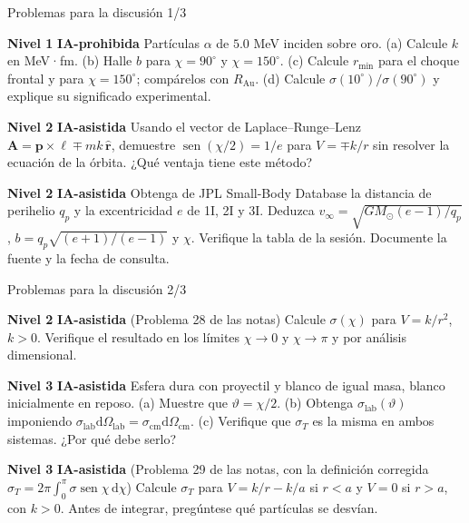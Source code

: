 \documentclass[aspectratio=169]{beamer}
\providecommand{\sen}{}
\renewcommand{\sen}{\operatorname{sen}}
\newcommand{\rmin}{r_{\min}}
\newcommand{\dd}{\mathrm{d}}
\newcommand{\IAprohibida}{\colorbox{red!20}{\scriptsize\textbf{IA-prohibida}}}
\newcommand{\IAasistida}{\colorbox{yellow!30}{\scriptsize\textbf{IA-asistida}}}
\newcommand{\nivel}[1]{\colorbox{blue!12}{\scriptsize\textbf{Nivel #1}}}
\begin{document}
\begin{frame}{Problemas para la discusión 1/3}
\small
\begin{description}[P0]
  \item[P1] \nivel{1} \IAprohibida{}
        Partículas $\alpha$ de $5.0$ MeV inciden sobre oro.
        (a) Calcule $k$ en MeV·fm. (b) Halle $b$ para $\chi=90^\circ$ y $\chi=150^\circ$.
        (c) Calcule $\rmin$ para el choque frontal y para $\chi=150^\circ$; compárelos con
        $R_{\text{Au}}$. (d) Calcule $\sigma(10^\circ)/\sigma(90^\circ)$ y explique su significado
        experimental.
  \item[P2] \nivel{2} \IAasistida{}
        Usando el vector de Laplace–Runge–Lenz
        $\mathbf A=\mathbf p\times\boldsymbol\ell\mp mk\,\hat{\mathbf r}$, demuestre
        $\sen(\chi/2)=1/e$ para $V=\mp k/r$ sin resolver la ecuación de la órbita.
        ¿Qué ventaja tiene este método?
  \item[P3] \nivel{2} \IAasistida{}
        Obtenga de JPL Small-Body Database la distancia de perihelio $q_p$ y la
        excentricidad $e$ de 1I, 2I y 3I. Deduzca $v_\infty=\sqrt{GM_\odot(e-1)/q_p}$,
        $b=q_p\sqrt{(e+1)/(e-1)}$ y $\chi$. Verifique la tabla de la sesión.
        Documente la fuente y la fecha de consulta.
\end{description}
\end{frame}

\begin{frame}{Problemas para la discusión 2/3}
\small
\begin{description}[P0]
  \item[P4] \nivel{2} \IAasistida{} (Problema 28 de las notas)
        Calcule $\sigma(\chi)$ para $V=k/r^{2}$, $k>0$. Verifique el resultado en los
        límites $\chi\to0$ y $\chi\to\pi$ y por análisis dimensional.
  \item[P5] \nivel{3} \IAasistida{}
        Esfera dura con proyectil y blanco de igual masa, blanco inicialmente en reposo.
        (a) Muestre que $\vartheta=\chi/2$. (b) Obtenga $\sigma_{\text{lab}}(\vartheta)$
        imponiendo $\sigma_{\text{lab}}\dd\Omega_{\text{lab}}=\sigma_{\text{cm}}\dd\Omega_{\text{cm}}$.
        (c) Verifique que $\sigma_T$ es la misma en ambos sistemas. ¿Por qué debe serlo?
  \item[P6] \nivel{3} \IAasistida{} (Problema 29 de las notas, con la definición corregida
        $\sigma_T=2\pi\int_0^\pi\sigma\sen\chi\,\dd\chi$)
        Calcule $\sigma_T$ para $V=k/r-k/a$ si $r<a$ y $V=0$ si $r>a$, con $k>0$.
        Antes de integrar, pregúntese qué partículas se desvían.
\end{description}
\end{frame}
\end{document}
